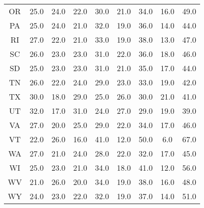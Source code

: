 \begin{table}
\begin{tabular}{ccccccccc}
   OR &     25.0 &   24.0 &      22.0 &    30.0 &      21.0 &    34.0 &      16.0 &    49.0 \\
   PA &     25.0 &   24.0 &      21.0 &    32.0 &      19.0 &    36.0 &      14.0 &    44.0 \\
   RI &     27.0 &   22.0 &      21.0 &    33.0 &      19.0 &    38.0 &      13.0 &    47.0 \\
   SC &     26.0 &   23.0 &      23.0 &    31.0 &      22.0 &    36.0 &      18.0 &    46.0 \\
   SD &     25.0 &   23.0 &      23.0 &    31.0 &      21.0 &    35.0 &      17.0 &    44.0 \\
   TN &     26.0 &   22.0 &      24.0 &    29.0 &      23.0 &    33.0 &      19.0 &    42.0 \\
   TX &     30.0 &   18.0 &      29.0 &    25.0 &      26.0 &    30.0 &      21.0 &    41.0 \\
   UT &     32.0 &   17.0 &      31.0 &    24.0 &      27.0 &    29.0 &      19.0 &    39.0 \\
   VA &     27.0 &   20.0 &      25.0 &    29.0 &      22.0 &    34.0 &      17.0 &    46.0 \\
   VT &     22.0 &   26.0 &      16.0 &    41.0 &      12.0 &    50.0 &       6.0 &    67.0 \\
   WA &     27.0 &   21.0 &      24.0 &    28.0 &      22.0 &    32.0 &      17.0 &    45.0 \\
   WI &     25.0 &   23.0 &      21.0 &    34.0 &      18.0 &    41.0 &      12.0 &    56.0 \\
   WV &     21.0 &   26.0 &      20.0 &    34.0 &      19.0 &    38.0 &      16.0 &    48.0 \\
   WY &     24.0 &   23.0 &      22.0 &    32.0 &      19.0 &    37.0 &      14.0 &    51.0 \\
\bottomrule
\end{tabular}
\end{table}
